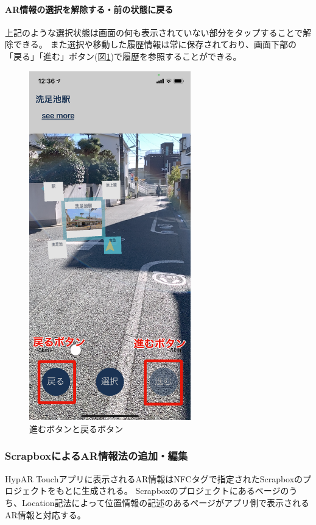 \paragraph*{AR情報の選択を解除する・前の状態に戻る}
上記のような選択状態は画面の何も表示されていない部分をタップすることで解除できる。
また選択や移動した履歴情報は常に保存されており、画面下部の「戻る」「進む」ボタン(図\ref{fig:hypar_touch_history_button})で履歴を参照することができる。

\begin{figure}[h]
  \centering
  \includegraphics[width=70mm]{images/hypar_touch_history_button.png}
  \caption{進むボタンと戻るボタン} \label{fig:hypar_touch_history_button}
\end{figure}

\subsubsection{ScrapboxによるAR情報法の追加・編集}
HypAR Touchアプリに表示されるAR情報はNFCタグで指定されたScrapboxのプロジェクトをもとに生成される。
Scrapboxのプロジェクトにあるページのうち、Location記法によって位置情報の記述のあるページがアプリ側で表示されるAR情報と対応する。

